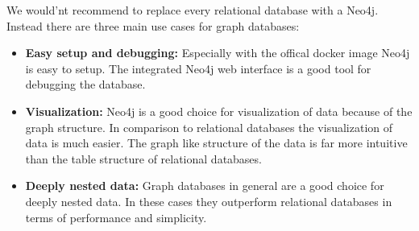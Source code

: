 We would'nt recommend to replace every relational database with a Neo4j.
Instead there are three main use cases for graph databases:
\begin{itemize}
      \item \textbf{Easy setup and debugging:} Especially with the offical docker
            image Neo4j is easy to setup. The integrated Neo4j web interface is a good tool for
            debugging the database.
      \item \textbf{Visualization:} Neo4j is a good choice for visualization of data
            because of the graph structure. In comparison to relational databases the
            visualization of data is much easier. The graph like structure of the data is
            far more intuitive than the table structure of relational databases.
      \item \textbf{Deeply nested data:} Graph databases in general are a good choice
            for deeply nested data. In these cases they outperform relational databases in
            terms of performance and simplicity.
\end{itemize}
